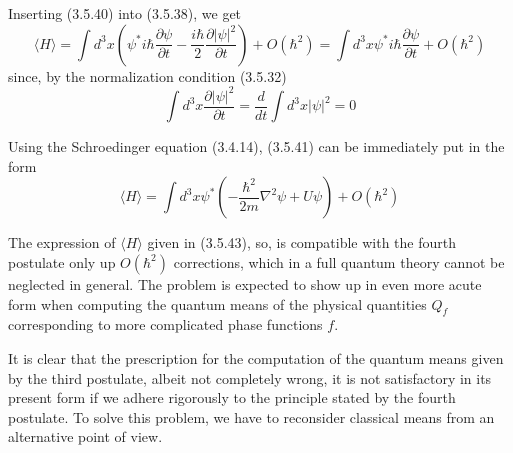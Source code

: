 \documentclass{article}
\begin{document}
Inserting (3.5.40) into (3.5.38), we get
$$
\begin{equation*}
\langle H\rangle=\int d^{3} x\left(\psi^{*} i \hbar \frac{\partial \psi}{\partial t}-\frac{i \hbar}{2} \frac{\partial|\psi|^{2}}{\partial t}\right)+O\left(\hbar^{2}\right)=\int d^{3} x \psi^{*} i \hbar \frac{\partial \psi}{\partial t}+O\left(\hbar^{2}\right) \tag{3.5.41}
\end{equation*}
$$
since, by the normalization condition (3.5.32)
$$
\begin{equation*}
\int d^{3} x \frac{\partial|\psi|^{2}}{\partial t}=\frac{d}{d t} \int d^{3} x|\psi|^{2}=0 \tag{3.5.42}
\end{equation*}
$$

Using the Schroedinger equation (3.4.14), (3.5.41) can be immediately put in the form
$$
\begin{equation*}
\langle H\rangle=\int d^{3} x \psi^{*}\left(-\frac{\hbar^{2}}{2 m} \nabla^{2} \psi+U \psi\right)+O\left(\hbar^{2}\right) \tag{3.5.43}
\end{equation*}
$$

The expression of $\langle H\rangle$ given in (3.5.43), so, is compatible with the fourth postulate only up $O\left(\hbar^{2}\right)$ corrections, which in a full quantum theory cannot be neglected in general. The problem is expected to show up in even more acute form when computing the quantum means of the physical quantities $Q_{f}$ corresponding to more complicated phase functions $f$.

It is clear that the prescription for the computation of the quantum means given by the third postulate, albeit not completely wrong, it is not satisfactory in its present form if we adhere rigorously to the principle stated by the fourth postulate. To solve this problem, we have to reconsider classical means from an alternative point of view.
\end{document}
